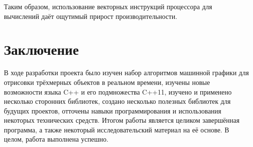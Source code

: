 \documentclass[a4paper,12pt]{report}
\numberwithin{equation}{section}
\begin{document}

Таким образом, использование векторных инструкций процессора для вычислений даёт ощутимый прирост производительности.

\section*{Заключение}
В ходе разработки проекта было изучен набор алгоритмов машинной графики для отрисовки трёхмерных объектов в реальном времени, изучены новые возможности языка C++ и его подмножества C++11, изучено и применено несколько сторонних библиотек, создано несколько полезных библиотек для будущих проектов, отточены навыки программирования и использования некоторых технических средств. Итогом работы является целиком завершённая программа, а также некоторый исследовательский материал на её основе. В целом, работа выполнена успешно.
\end{document}
